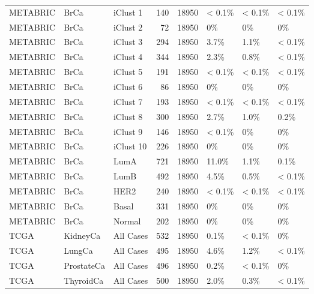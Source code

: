 \documentclass[]{article}
\begin{document}
\begin{table}[H]
{\begin{tabular}{lllrrlll}
\addlinespace
METABRIC & BrCa & iClust 1 & 140 & 18950 & < 0.1\% & < 0.1\% & < 0.1\%\\
METABRIC & BrCa & iClust 2 & 72 & 18950 & 0\% & 0\% & 0\%\\
METABRIC & BrCa & iClust 3 & 294 & 18950 & 3.7\% & 1.1\% & < 0.1\%\\
METABRIC & BrCa & iClust 4 & 344 & 18950 & 2.3\% & 0.8\% & < 0.1\%\\
METABRIC & BrCa & iClust 5 & 191 & 18950 & < 0.1\% & < 0.1\% & < 0.1\%\\
\addlinespace
METABRIC & BrCa & iClust 6 & 86 & 18950 & 0\% & 0\% & 0\%\\
METABRIC & BrCa & iClust 7 & 193 & 18950 & < 0.1\% & < 0.1\% & < 0.1\%\\
METABRIC & BrCa & iClust 8 & 300 & 18950 & 2.7\% & 1.0\% & 0.2\%\\
METABRIC & BrCa & iClust 9 & 146 & 18950 & < 0.1\% & 0\% & 0\%\\
METABRIC & BrCa & iClust 10 & 226 & 18950 & 0\% & 0\% & 0\%\\
\addlinespace
METABRIC & BrCa & LumA & 721 & 18950 & 11.0\% & 1.1\% & 0.1\%\\
METABRIC & BrCa & LumB & 492 & 18950 & 4.5\% & 0.5\% & < 0.1\%\\
METABRIC & BrCa & HER2 & 240 & 18950 & < 0.1\% & < 0.1\% & < 0.1\%\\
METABRIC & BrCa & Basal & 331 & 18950 & 0\% & 0\% & 0\%\\
METABRIC & BrCa & Normal & 202 & 18950 & 0\% & 0\% & 0\%\\
\addlinespace
TCGA & KidneyCa & All Cases & 532 & 18950 & 0.1\% & < 0.1\% & 0\%\\
TCGA & LungCa & All Cases & 495 & 18950 & 4.6\% & 1.2\% & < 0.1\%\\
TCGA & ProstateCa & All Cases & 496 & 18950 & 0.2\% & < 0.1\% & 0\%\\
TCGA & ThyroidCa & All Cases & 500 & 18950 & 2.0\% & 0.3\% & < 0.1\%\\
\bottomrule
\end{tabular}}
\end{table}
\end{document}
